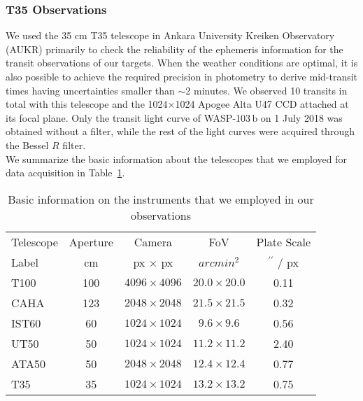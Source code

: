 \documentclass[a4paper,fleqn,usenatbib]{mnras}
\begin{document}
\subsubsection{T35 Observations}
We used the 35 cm T35 telescope in Ankara University Kreiken Observatory (AUKR) primarily to check the reliability of the ephemeris information for the transit observations of our targets. When the weather conditions are optimal, it is also possible to achieve the required precision in photometry to derive mid-transit times having uncertainties smaller than $\sim$2 minutes. We observed 10 transits in total with this telescope and the 1024$\times$1024 Apogee Alta U47 CCD attached at its focal plane. Only the transit light curve of WASP-103\,b on 1 July 2018 was obtained without a filter, while the rest of the light curves were acquired through the Bessel $R$ filter.\\

We summarize the basic information about the telescopes that we employed for data acquisition in Table~\ref{tab:instruments}.

\begin{table}
  \centering
  \caption{Basic information on the instruments that we employed in our observations}
  \label{tab:instruments}
  \footnotesize
  \begin{tabular}{lcccc} %
    \hline
    Telescope & Aperture & Camera & FoV & Plate Scale \\
    Label & cm & px $\times$ px & $arcmin^{2}$ & $^{\prime\prime}$ / px \\
    \hline
    T100 & 100 & $4096 \times 4096$ & $20.0 \times 20.0$ & 0.11 \\
    CAHA & 123 & $2048 \times 2048$ & $21.5 \times 21.5$ & 0.32 \\
    IST60 & 60 & $1024 \times 1024$ & $9.6 \times 9.6$ & 0.56 \\
    UT50 & 50 & $1024 \times 1024$ & $11.2 \times 11.2$ & 2.40 \\
    ATA50 & 50 & $2048 \times 2048$ & $12.4 \times 12.4$ & 0.77 \\
    T35 & 35 & $1024 \times 1024$ & $13.2 \times 13.2$ & 0.75 \\
    \hline
	\end{tabular}
\end{table}
\end{document}
